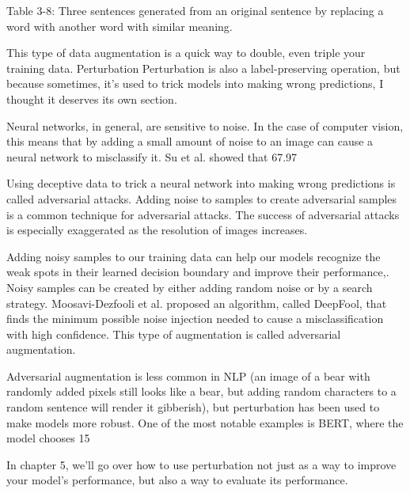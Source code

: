 \documentclass[openany]{book}
\begin{document}
Table 3-8: Three sentences generated from an original sentence by replacing a word 
with another word with similar meaning.

This type of data augmentation is a quick way to double, even triple your training data.
Perturbation
Perturbation is also a label-preserving operation, but because sometimes, it’s used to trick models into making wrong predictions, I thought it deserves its own section.

Neural networks, in general, are sensitive to noise. In the case of computer vision, this means that by adding a small amount of noise to an image can cause a neural network to misclassify it.  Su et al. showed that 67.97%

Using deceptive data to trick a neural network into making wrong predictions is called adversarial attacks. Adding noise to samples to create adversarial samples is a common technique for adversarial attacks. The success of adversarial attacks is especially exaggerated as the resolution of images increases.

Adding noisy samples to our training data can help our models recognize the weak spots in their learned decision boundary and improve their performance,. Noisy samples can be created by either adding random noise or by a search strategy. Moosavi-Dezfooli et al. proposed an algorithm, called DeepFool, that finds the minimum possible noise injection needed to cause a misclassification with high confidence. This type of augmentation is called adversarial augmentation.

Adversarial augmentation is less common in NLP (an image of a bear with randomly added pixels still looks like a bear, but adding random characters to a random sentence will render it gibberish), but perturbation has been used to make models more robust. One of the most notable examples is BERT, where the model chooses 15%

In chapter 5, we’ll go over how to use perturbation not just as a way to improve your model’s performance, but also a way to evaluate its performance.
\end{document}
